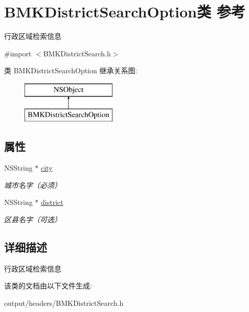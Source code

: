 \hypertarget{interface_b_m_k_district_search_option}{}\section{B\+M\+K\+District\+Search\+Option类 参考}
\label{interface_b_m_k_district_search_option}


行政区域检索信息  




{\ttfamily \#import $<$B\+M\+K\+District\+Search.\+h$>$}

类 B\+M\+K\+District\+Search\+Option 继承关系图\+:\begin{figure}[H]
\begin{center}
\leavevmode
\includegraphics[height=2.000000cm]{interface_b_m_k_district_search_option}
\end{center}
\end{figure}
\subsection*{属性}
\begin{DoxyCompactItemize}
\item 
\hypertarget{interface_b_m_k_district_search_option_a299d11fca1763255bc539dd11532dd9b}{}N\+S\+String $\ast$ \hyperlink{interface_b_m_k_district_search_option_a299d11fca1763255bc539dd11532dd9b}{city}\label{interface_b_m_k_district_search_option_a299d11fca1763255bc539dd11532dd9b}

\begin{DoxyCompactList}\small\item\em 城市名字（必须） \end{DoxyCompactList}\item 
\hypertarget{interface_b_m_k_district_search_option_a8899b8d70254baa0466ac1970193792c}{}N\+S\+String $\ast$ \hyperlink{interface_b_m_k_district_search_option_a8899b8d70254baa0466ac1970193792c}{district}\label{interface_b_m_k_district_search_option_a8899b8d70254baa0466ac1970193792c}

\begin{DoxyCompactList}\small\item\em 区县名字（可选） \end{DoxyCompactList}\end{DoxyCompactItemize}


\subsection{详细描述}
行政区域检索信息 

该类的文档由以下文件生成\+:\begin{DoxyCompactItemize}
\item 
output/headers/B\+M\+K\+District\+Search.\+h\end{DoxyCompactItemize}
